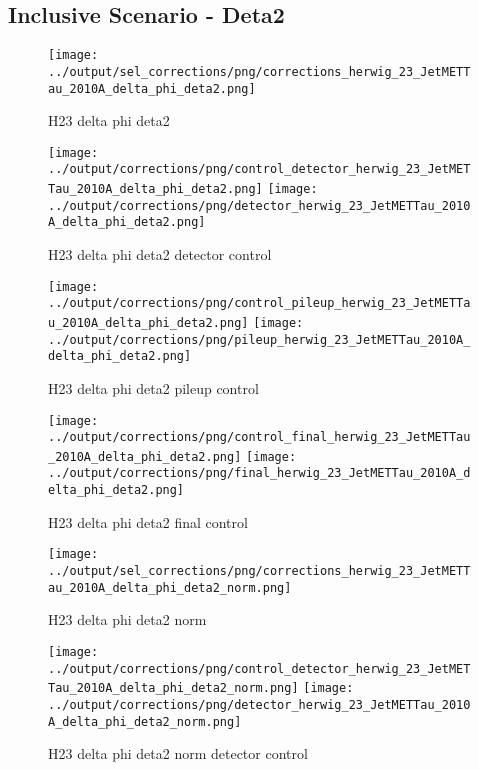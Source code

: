\documentclass[11pt]{book}
\begin{document}
\clearpage
\subsection{Inclusive Scenario - Deta2}

\begin{figure}[ht]
\centering
\texttt{[image: ../output/sel\_corrections/png/corrections\_herwig\_23\_JetMETTau\_2010A\_delta\_phi\_deta2.png]}
\caption{H23 delta phi deta2}
\label{fig:H23_JetMETTau_2010A_delta_phi_deta2}
\end{figure}


\begin{figure}[ht]
\centering
\texttt{[image: ../output/corrections/png/control\_detector\_herwig\_23\_JetMETTau\_2010A\_delta\_phi\_deta2.png]}
\texttt{[image: ../output/corrections/png/detector\_herwig\_23\_JetMETTau\_2010A\_delta\_phi\_deta2.png]}
\caption{H23 delta phi deta2 detector control}
\label{fig:H23_JetMETTau_2010A_delta_phi_deta2_detector_control}
\end{figure}

\begin{figure}[ht]
\centering
\texttt{[image: ../output/corrections/png/control\_pileup\_herwig\_23\_JetMETTau\_2010A\_delta\_phi\_deta2.png]}
\texttt{[image: ../output/corrections/png/pileup\_herwig\_23\_JetMETTau\_2010A\_delta\_phi\_deta2.png]}
\caption{H23 delta phi deta2 pileup control}
\label{fig:H23_JetMETTau_2010A_delta_phi_deta2_pileup_control}
\end{figure}


\begin{figure}[ht]
\centering
\texttt{[image: ../output/corrections/png/control\_final\_herwig\_23\_JetMETTau\_2010A\_delta\_phi\_deta2.png]}
\texttt{[image: ../output/corrections/png/final\_herwig\_23\_JetMETTau\_2010A\_delta\_phi\_deta2.png]}
\caption{H23 delta phi deta2 final control}
\label{fig:H23_JetMETTau_2010A_delta_phi_deta2_final_control}
\end{figure}


\begin{figure}[ht]
\centering
\texttt{[image: ../output/sel\_corrections/png/corrections\_herwig\_23\_JetMETTau\_2010A\_delta\_phi\_deta2\_norm.png]}
\caption{H23 delta phi deta2 norm}
\label{fig:H23_JetMETTau_2010A_delta_phi_deta2_norm}
\end{figure}

\begin{figure}[ht]
\centering
\texttt{[image: ../output/corrections/png/control\_detector\_herwig\_23\_JetMETTau\_2010A\_delta\_phi\_deta2\_norm.png]}
\texttt{[image: ../output/corrections/png/detector\_herwig\_23\_JetMETTau\_2010A\_delta\_phi\_deta2\_norm.png]}
\caption{H23 delta phi deta2 norm detector control}
\label{fig:H23_JetMETTau_2010A_delta_phi_deta2_norm_detector_control}
\end{figure}
\end{document}
